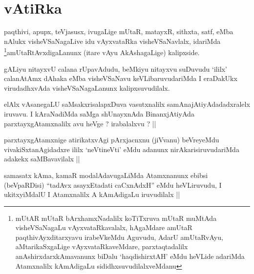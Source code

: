 \section*{vAtiRka}

\begin{artha}
paqthivi, apupx, teVjasusx, ivugaLige mUtaR, matayxR, sithxta, satf,
eMba nAlukx visheVSaNagaLive idu vAyxvataRka visheVSaNavlalx,
idariMda \footnote{mUtAR mUtaR bArxhamxNadalilx koTiTxruva mUtaR
  muMtAda visheVSaNagaLu vAyxvataRkavalalx, hAgaMdare amUtaR
  paqthivAyxditarxyavu irabeVkeMdu Aguvudu, AdarU amUtaRvAyu,
  aMtarikaSxgaLige vAyxvataRkaveMdare, parxtaqtadalilx
  anAshirxdarxkAmavanunx biDalu `haqdishirxtAH' eMdu heVLide adariMda
  Atamxnalilx kAmAdigaLu sididhxsuvudilalxveMdanu}amUtaRtAvxdigaLanunx (itare vAyu AkAshagaLige)
kalipxside. 
\end{artha}


\begin{artha}
gALiyu nitayxvU calana rUpavAdudu, beMkiyu nitayxvu suDuvudu `ililx'
calanAtAmx dAhaka eMba visheVSaNavu keVLibaruvudariMda I eraDakUkx
virudadhxvAda visheVSaNagaLanunx kalipxsuvudilalx.
\end{artha}


\begin{artha}
elAlx vAsanegaLU saMsakxrisalapxDuva vasutxnalilx
samAnajAtiyAdadadxralelx iruvavu. I kAraNadiMda saMga shUnayxnAda
BinanxjAtiyAda parxtayxgAtamxnalilx avu heVge ? irabalalxvu ? ||
\end{artha}

\begin{artha}
parxtayxgAtamxnige atirikatxvAgi pArxjacnxnu (jiVvanu) beVreyeMdu
vivakiSxtanAgidadxre ililx `neVtineVti' eMdu adanunx
nirAkarisiruvudariMda adakekx saMBavavilalx ||
\end{artha}


\begin{artha}
samasatx kAma, kamaR modalAdavugaLiMda Atamxnanunx ebibsi (beVpaRDisi)
``tadAvx asayxEtadati caCxnAdxH'' eMdu heVLiruvudu, I ukitxyiMdalU I
Atamxnalilx A kAmAdigaLu iruvudilalx ||
\end{artha}

